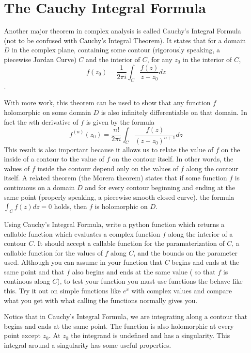 \section*{The Cauchy Integral Formula}

Another major theorem in complex analysis is called Cauchy's Integral Formula (not to be confused with Cauchy's Integral Theorem).
It states that for a domain $D$ in the complex plane, containing some contour (rigorously speaking, a piecewise Jordan Curve) $C$ and the interior of $C$, for any $z_0$ in the interior of $C$, 
$$f(z_0)=\frac{1}{2\pi i} \int_C \frac{f(z)}{z-z_0} dz$$. 

With more work, this theorem can be used to show that any function $f$ holomorphic on some domain $D$ is also infinitely differentiable on that domain.
In fact the $n$th derivative of $f$ is given by the formula $$f^{(n)}(z_0) = \frac{n!}{2\pi i} \int_C \frac{f(z)}{(z-z_0)^{n+1}} dz$$
This result is also important because it allows us to relate the value of $f$ on the inside of a contour to the value of $f$ on the contour itself.
In other words, the values of $f$ inside the contour depend only on the values of $f$ along the contour itself.
A related theorem (the Morera theorem) states that if some function $f$ is continuous on a domain $D$ and for every contour beginning and ending at the same point (properly speaking, a piecewise smooth closed curve), the formula $\int_C f(z) dz = 0$ holds, then $f$ is holomorphic on $D$. 

\begin{problem}
Using Cauchy's Integral Formula, write a python function which returns a callable function which evaluates a complex function $f$ along the interior of a contour $C$. It should accept a callable function for the paramaterization of $C$, a callable function for the values of $f$ along $C$, and the bounds on the parameter used. Although you can assume in your function  that $C$ begins and ends at the same point and that $f$ also begins and ends at the same value ( so that $f$ is continous along $C$), to test your function you must use functions the behave like this. Try it out on simple functions like $e^x$ with complex values and compare what you get with what calling the functions normally gives you.
\end{problem}

Notice that in Cauchy's Integral Formula, we are integrating along a contour that begins and ends at the same point.
The function is also holomorphic at every point except $z_0$. At $z_0$ the integrand is undefined and has a singularity.
This integral around a singularity has some useful properties.